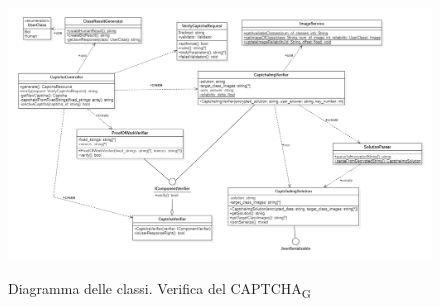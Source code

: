 
\begin{figure}[H]
	\centering
	\includegraphics[scale = 0.45]{img/verify.png}\\
	\caption{Diagramma delle classi. Verifica del CAPTCHA\textsubscript{G}}
\end{figure}


